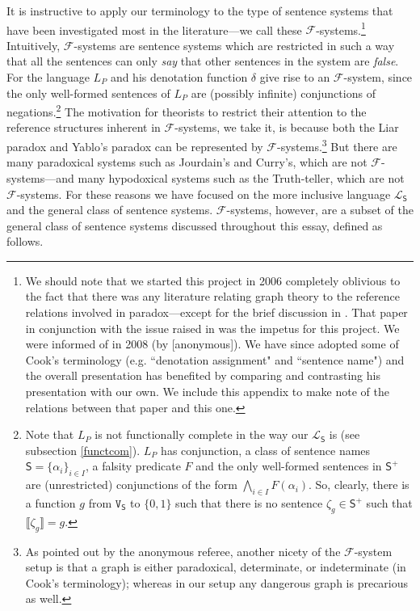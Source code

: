 \documentclass[12pt]{kluwer}
\theoremstyle{remark}
\newcommand{\fancy}[1]{\mathcal{#1}}
\def\S{\textsf{S}}
\def\V{\texttt{V}}
\def\L{\fancy{L}}
\def\F{\fancy{F}}
\def\F{\fancy{F}}
\begin{document}
It is instructive to apply our terminology to the type of sentence systems that have been investigated most in the literature---we call these $\F$-systems.\footnote{We should note that we started this project in 2006 completely oblivious to the fact that there was any literature relating graph theory to the reference relations involved in paradox---except for the brief discussion in \cite{yablo06}. That paper in conjunction with the issue raised in \cite{yablo93} was the impetus for this project. We were informed of \cite{cook} in 2008 (by [anonymous]).
We have since adopted some of Cook's terminology (e.g. ``denotation assignment" and ``sentence name") and the overall presentation has benefited by comparing and contrasting his presentation with our own. We include this appendix to make note of the relations between that paper and this one.} Intuitively, $\F$-systems are sentence systems which are restricted in such a way that all the sentences can only \textit{say} that other sentences in the system are \textit{false}. For \cite{cook} the language $L_P$ and his denotation function $\delta$ give rise to an $\F$-system, since the only well-formed sentences of $L_P$ are (possibly infinite) conjunctions of negations.\footnote{Note that $L_P$ is not functionally complete in the way our $\L_\S$ is (see subsection \ref{functcom}). $L_P$ has conjunction, a class of sentence names $\S = \{\alpha_i\}_{i \in I}$, a falsity predicate $F$ and the only well-formed sentences in $\S^{+}$ are (unrestricted) conjunctions of the form $\bigwedge_{i \in I} F(\alpha_i)$. So, clearly, there is a function $g$ from $\V_\S$ to $\{0,1\}$ such that there is no sentence $\zeta_g \in \S^{+}$ such that $\llbracket \zeta_g\rrbracket = g$.}  The motivation for theorists to restrict their attention to the reference structures inherent in $\F$-systems, we take it, is because both the Liar paradox and Yablo's paradox can be represented by $\F$-systems.\footnote{As pointed out by the anonymous referee, another nicety of the $\F$-system setup is that a graph is either paradoxical, determinate,
or indeterminate (in Cook's terminology); whereas in our setup any dangerous graph is precarious as well.} But there are many paradoxical systems such as Jourdain's and Curry's, which are not $\F$-systems---and many hypodoxical systems such as the Truth-teller, which are not $\F$-systems. For these reasons we have focused on the more inclusive language $\L_\S$ and the general class of sentence systems. $\F$-systems, however, are a subset of the general class of sentence systems discussed throughout this essay, defined as follows.
\end{document}
